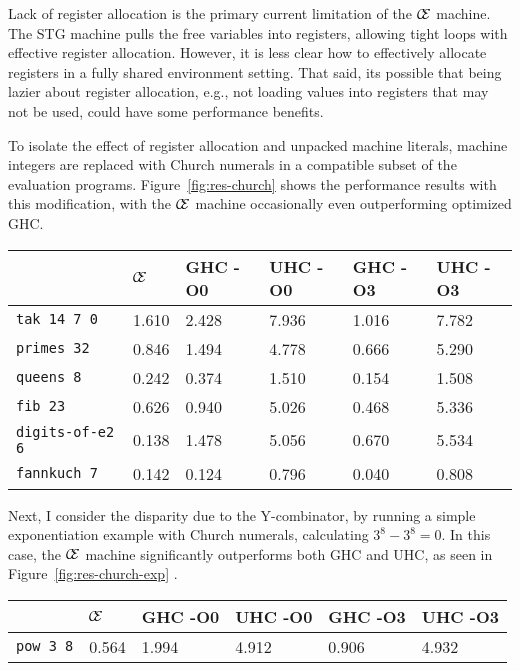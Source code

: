 Lack of register allocation is the primary current limitation of the $\mathcal{\mathcal{C} \mskip -4mu \mathcal{E}}$
machine. The STG machine pulls the free variables into registers, allowing tight
loops with effective register allocation. However, it is less clear how to
effectively allocate registers in a fully shared environment setting.  That
said, its possible that being lazier about register allocation, e.g., not
loading values into registers that may not be used, could have some performance
benefits.

To isolate the effect of register allocation and unpacked machine
literals, machine integers are replaced with Church numerals in a compatible
subset of the evaluation programs. Figure~\ref{fig:res-church} shows the
performance results with this modification, with the $\mathcal{\mathcal{C}
\mskip -4mu \mathcal{E}}$ machine occasionally even outperforming optimized GHC.

\begin{figure*}
\centering
\begin{tabularx}{\textwidth}{l | X | X | X | X | X}
& $\mathcal{\mathcal{C} \mskip -4mu \mathcal{E}}$ & GHC -O0 & UHC -O0 & GHC -O3 & UHC -O3 \\
\hline
\texttt{tak 14 7 0} & 1.610 & 2.428 & 7.936 & 1.016 & 7.782 \\
\texttt{primes 32} & 0.846 & 1.494 & 4.778 & 0.666 & 5.290 \\
\texttt{queens 8} & 0.242 & 0.374 & 1.510 & 0.154 & 1.508 \\
\texttt{fib 23} & 0.626 & 0.940 & 5.026 & 0.468 & 5.336 \\
\texttt{digits-of-e2 6} & 0.138 & 1.478 & 5.056 & 0.670 & 5.534 \\
\texttt{fannkuch 7} & 0.142 & 0.124 & 0.796 & 0.040 & 0.808 \\
\end{tabularx}
\caption{Church Numeral Benchmark Results. Measurement is wall clock time, 
units are seconds. Times averaged over 5 runs. Variance is relatively low
($\approx10\%$).}
\label{fig:res-church}
\end{figure*}

Next, I consider the disparity due to the Y-combinator, by running a simple
exponentiation example with Church numerals, calculating $3^8 - 3^8 = 0$. In
this case, the $\mathcal{\mathcal{C} \mskip -4mu \mathcal{E}}$ machine
significantly outperforms both GHC and UHC, as seen in
Figure~\ref{fig:res-church-exp} .

\begin{figure*}
\begin{tabularx}{\textwidth}{l | X | X | X | X | X}
& $\mathcal{\mathcal{C} \mskip -4mu \mathcal{E}}$ & GHC -O0 & UHC -O0 & GHC -O3 & UHC -O3 \\
\hline
\texttt{pow 3 8} & 0.564 & 1.994 & 4.912 & 0.906 & 4.932 \\
\end{tabularx}
\caption{Church Numeral Exponentiation Benchmark Results. Measurement is wall clock time, 
units are seconds. Times averaged over 5 runs. Variance is relatively low
($\approx10\%$).}
\label{fig:res-church-exp}
\end{figure*}


